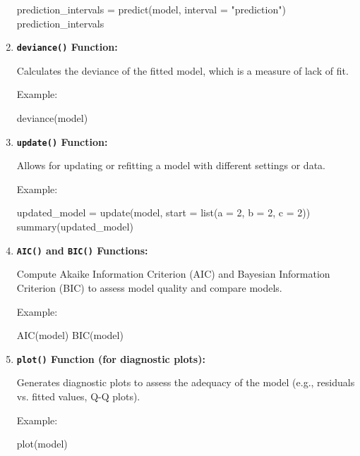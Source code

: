 \documentclass[
]{article}
\newenvironment{Shaded}{}{}
\newcommand{\AttributeTok}[1]{\textcolor[rgb]{0.49,0.56,0.16}{#1}}
\newcommand{\DecValTok}[1]{\textcolor[rgb]{0.25,0.63,0.44}{#1}}
\newcommand{\FunctionTok}[1]{\textcolor[rgb]{0.02,0.16,0.49}{#1}}
\newcommand{\NormalTok}[1]{#1}
\newcommand{\OtherTok}[1]{\textcolor[rgb]{0.00,0.44,0.13}{#1}}
\newcommand{\StringTok}[1]{\textcolor[rgb]{0.25,0.44,0.63}{#1}}
\begin{document}
\begin{enumerate}
\begin{Shaded}
\begin{Highlighting}[]
\NormalTok{prediction\_intervals }\OtherTok{=} \FunctionTok{predict}\NormalTok{(model, }\AttributeTok{interval =} \StringTok{"prediction"}\NormalTok{)}
\NormalTok{prediction\_intervals}
\end{Highlighting}
\end{Shaded}
\item
  \textbf{\texttt{deviance()} Function:}

  Calculates the deviance of the fitted model, which is a measure of
  lack of fit.

  Example:

\begin{Shaded}
\begin{Highlighting}[]
\FunctionTok{deviance}\NormalTok{(model)}
\end{Highlighting}
\end{Shaded}
\item
  \textbf{\texttt{update()} Function:}

  Allows for updating or refitting a model with different settings or
  data.

  Example:

\begin{Shaded}
\begin{Highlighting}[]
\NormalTok{updated\_model }\OtherTok{=} \FunctionTok{update}\NormalTok{(model, }\AttributeTok{start =} \FunctionTok{list}\NormalTok{(}\AttributeTok{a =} \DecValTok{2}\NormalTok{, }\AttributeTok{b =} \DecValTok{2}\NormalTok{, }\AttributeTok{c =} \DecValTok{2}\NormalTok{))}
\FunctionTok{summary}\NormalTok{(updated\_model)}
\end{Highlighting}
\end{Shaded}
\item
  \textbf{\texttt{AIC()} and \texttt{BIC()} Functions:}

  Compute Akaike Information Criterion (AIC) and Bayesian Information
  Criterion (BIC) to assess model quality and compare models.

  Example:

\begin{Shaded}
\begin{Highlighting}[]
\FunctionTok{AIC}\NormalTok{(model)}
\FunctionTok{BIC}\NormalTok{(model)}
\end{Highlighting}
\end{Shaded}
\item
  \textbf{\texttt{plot()} Function (for diagnostic plots):}

  Generates diagnostic plots to assess the adequacy of the model (e.g.,
  residuals vs. fitted values, Q-Q plots).

  Example:

\begin{Shaded}
\begin{Highlighting}[]
\FunctionTok{plot}\NormalTok{(model)}
\end{Highlighting}
\end{Shaded}
\end{enumerate}
\end{document}
